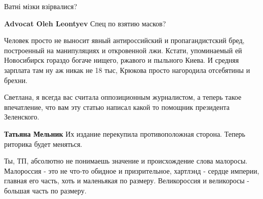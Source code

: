 \begin{itemize}
\begin{itemize}
Ватні мізки взірвалися?

 
\textbf{Advocat Oleh Leontyev} Спец по взятию масков?

 
Человек просто не выносит явный антироссийский и пропагандистский бред,
построенный на манипуляциях и откровенной лжи. Кстати, упоминаемый ей
Новосибирск гораздо богаче нищего, ржавого и пыльного Киева. И средняя зарплата
там ну аж никак не 18 тыс, Крюкова просто нагородила отсебятины и брехни.

\end{itemize}

 

Светлана, я всегда вас считала оппозиционным журналистом, а теперь такое
впечатление, что вам эту статью написал какой то помощник президента
Зеленского.

\begin{itemize}
 
\textbf{Татьяна Мельник} Их издание перекупила противоположная сторона. Теперь риторика будет меняться.
\end{itemize}


Ты, ТП, абсолютно не понимаешь значение и происхождение слова малоросы.
Малороссия - это не что-то обидное и призрительное, хартлэнд - сердце империи,
главная его часть, хоть и маленьякая по размеру. Великороссия и великоросы -
большая часть по размеру.

\end{itemize}


